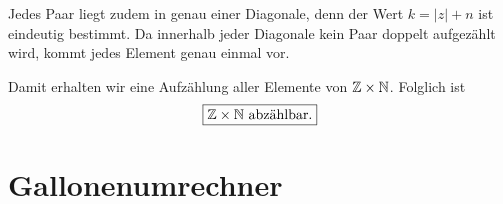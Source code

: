 \documentclass{report}
\begin{document}
Jedes Paar liegt zudem in genau einer Diagonale, denn der Wert \(k=|z|+n\) ist eindeutig bestimmt. Da innerhalb jeder Diagonale kein Paar doppelt aufgezählt wird, kommt jedes Element genau einmal
vor.

Damit erhalten wir eine Aufzählung aller Elemente von
\(\mathbb{Z}\times\mathbb{N}\). Folglich ist
\[
\boxed{\mathbb{Z}\times\mathbb{N}\text{ abzählbar}.}
\]
\newpage
\section{Gallonenumrechner}

\end{document}
